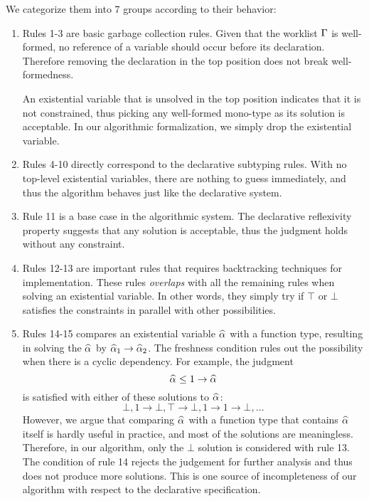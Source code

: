 We categorize them into 7 groups according to their behavior:
\begin{enumerate}
    \item Rules 1-3 are basic garbage collection rules.
        Given that the worklist $\Gamma$ is well-formed,
        no reference of a variable should occur before its declaration.
        Therefore removing the declaration in the top position does not break well-formedness.

        An existential variable that is unsolved in the top position indicates
        that it is not constrained,
        thus picking any well-formed mono-type as its solution is acceptable.
        In our algorithmic formalization, we simply drop the existential variable.

    \item Rules 4-10 directly correspond to the declarative subtyping rules.
        With no top-level existential variables,
        there are nothing to guess immediately,
        and thus the algorithm behaves just like the declarative system.

    \item Rule 11 is a base case in the algorithmic system.
        The declarative reflexivity property suggests that any solution is acceptable,
        thus the judgment holds without any constraint.
    
    \item Rules 12-13 are important rules that requires backtracking techniques
        for implementation.
        These rules \emph{overlaps} with all the remaining rules when solving
        an existential variable.
        In other words, they simply try if $\top$ or $\bot$ satisfies the constraints
        in parallel with other possibilities.
    
    \item Rules 14-15 compares an existential variable $\al$ with a function type,
        resulting in solving the $\al$ by $\al[1] \to \al[2]$.
        The freshness condition rules out the possibility
        when there is a cyclic dependency.
        For example, the judgment
        \[\al \le 1 \to \al\]
        is satisfied with either of these solutions to $\al$:
        \[ \bot, 1 \to \bot, \top \to \bot, 1 \to 1 \to \bot, \ldots \]
        However, we argue that comparing $\al$ with a function type
        that contains $\al$ itself is hardly useful in practice,
        and most of the solutions are meaningless.
        Therefore, in our algorithm, only the $\bot$ solution is considered
        with rule 13.
        The condition of rule 14 rejects the judgement for further analysis
        and thus does not produce more solutions.
        This is one source of incompleteness of our algorithm with respect to the declarative specification.
    

\end{enumerate}
